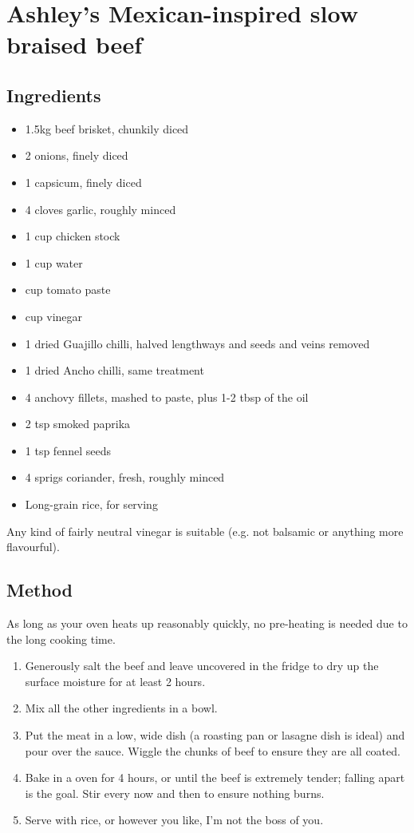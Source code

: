 \clearpage
\section{Ashley's Mexican-inspired slow braised beef}


\subsection{Ingredients}

\begin{itemize}
	\item 1.5kg beef brisket, chunkily diced
	\item 2 onions, finely diced
	\item 1 capsicum, finely diced
	\item 4 cloves garlic, roughly minced
	\item 1 cup chicken stock
	\item 1 cup water
	\item {} cup tomato paste
	\item {} cup vinegar
	\item 1 dried Guajillo chilli, halved lengthways and seeds and veins removed
	\item 1 dried Ancho chilli, same treatment
	\item 4 anchovy fillets, mashed to paste, plus 1-2 tbsp of the oil
	\item 2 tsp smoked paprika
	\item 1 tsp fennel seeds
	\item 4 sprigs coriander, fresh, roughly minced
	\item Long-grain rice, for serving
\end{itemize}

Any kind of fairly neutral vinegar is suitable (e.g. not balsamic or anything more flavourful).

\subsection{Method}

As long as your oven heats up reasonably quickly, no pre-heating is needed due to the long cooking time.

\begin{enumerate}
	\item Generously salt the beef and leave uncovered in the fridge to dry up the surface moisture for at least 2 hours.
	\item Mix all the other ingredients in a bowl.
	\item Put the meat in a low, wide dish (a roasting pan or lasagne dish is ideal) and pour over the sauce. Wiggle the chunks of beef to ensure they are all coated.
	\item Bake in a  oven for 4 hours, or until the beef is extremely tender; falling apart is the goal. Stir every now and then to ensure nothing burns.
	\item Serve with rice, or however you like, I'm not the boss of you.
\end{enumerate}
